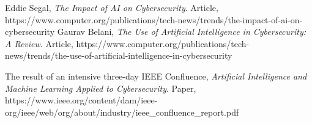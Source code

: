 \documentclass{article}
\begin{document}
	\begin{thebibliography}{3} 
		 Eddie Segal, \emph{The Impact of AI on Cybersecurity}. Article, https://www.computer.org/publications/tech-news/trends/the-impact-of-ai-on-cybersecurity
		 Gaurav Belani, \emph{The Use of Artificial Intelligence in Cybersecurity: A Review}. Article, https://www.computer.org/publications/tech-news/trends/the-use-of-artificial-intelligence-in-cybersecurity
		
		 The	result	of	an intensive	three-day IEEE	Confluence, \emph{Artificial Intelligence and Machine	Learning Applied to Cybersecurity}. Paper, https://www.ieee.org/content/dam/ieee-org/ieee/web/org/about/industry/ieee\_confluence\_report.pdf
	\end{thebibliography}
	
\end{document}
